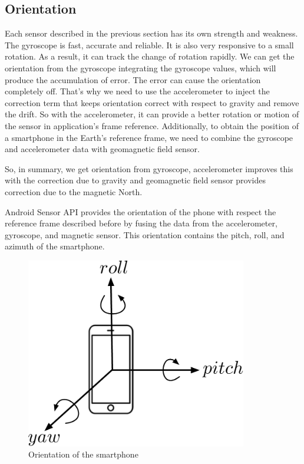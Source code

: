 \subsection{Orientation}
Each sensor described in the previous section has its own strength and weakness.
The gyroscope is fast, accurate and reliable.
It is also very responsive to a small rotation.
As a result, it can track the change of rotation rapidly.
We can get the orientation from the gyroscope integrating the gyroscope values, which will produce the accumulation of error.
The error can cause the orientation completely off.
That's why we need to use the accelerometer to inject the correction term that keeps orientation correct with respect to gravity and remove the drift.
So with the accelerometer, it can provide a better rotation or motion of the sensor in application's frame reference.
Additionally, to obtain the position of a smartphone in the Earth's reference frame, we need to combine the gyroscope and accelerometer data with geomagnetic field sensor.

So, in summary, we get orientation from gyroscope, accelerometer improves this with the correction due to gravity and geomagnetic field sensor  provides correction due to the magnetic North.

Android Sensor API \cite {api_android} provides the orientation of the phone with respect the reference frame described before by fusing the data from the accelerometer, gyroscope, and magnetic sensor. 
This orientation contains the pitch, roll, and azimuth of the smartphone. 

%
\begin{figure}
\centering
\includegraphics[width=3.8in]{figures/roll_pitch_yaw.pdf}
\caption{Orientation of the smartphone}
\label{f:rpy_dia}
\end{figure}

